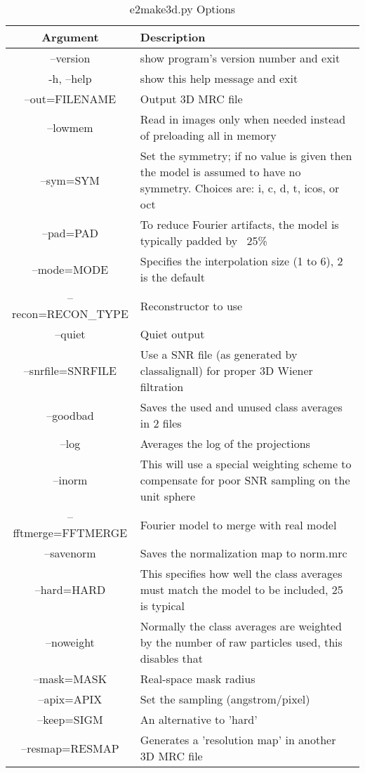 \begin{longtable}{|c||p{3.5in}|}
\hline \bf{Argument} & \bf{Description}\endhead
\hline \multicolumn{2}{r}{{Continued on next page}} \endfoot
\hline \hline \caption[e2make3d.py Options]{e2make3d.py Options}\endlastfoot
\\\hline   --version  &  show program's version number and exit
\\\hline   -h, --help  &  show this help message and exit
\\\hline   --out=FILENAME  &  Output 3D MRC file
\\\hline   --lowmem  &  Read in images only when needed instead of preloading all in memory
\\\hline   --sym=SYM  &  Set the symmetry; if no value is given then the model is assumed to have no symmetry. Choices are: i, c, d, t, icos, or oct
\\\hline   --pad=PAD  &  To reduce Fourier artifacts, the model is typically padded by ~25\%
\\\hline   --mode=MODE  &  Specifies the interpolation size (1 to 6), 2 is the default
\\\hline   --recon=RECON\_TYPE  &  Reconstructor to use
\\\hline   --quiet  &  Quiet output
\\\hline   --snrfile=SNRFILE  &  Use a SNR file (as generated by classalignall) for proper 3D Wiener filtration
\\\hline   --goodbad  &  Saves the used and unused class averages in 2 files
\\\hline   --log  &  Averages the log of the projections
\\\hline   --inorm  &  This will use a special weighting scheme to compensate for poor SNR sampling on the unit sphere
\\\hline   --fftmerge=FFTMERGE  &  Fourier model to merge with real model
\\\hline   --savenorm  &  Saves the normalization map to norm.mrc
\\\hline   --hard=HARD  &  This specifies how well the class averages must match the model to be included, 25 is typical
\\\hline   --noweight  &  Normally the class averages are weighted by the number of raw particles used, this disables that
\\\hline   --mask=MASK  &  Real-space mask radius
\\\hline   --apix=APIX  &  Set the sampling (angstrom/pixel)
\\\hline   --keep=SIGM  &  An alternative to 'hard'
\\\hline
 --resmap=RESMAP  &  Generates a 'resolution map' in another 3D MRC file
\\\hline
\end{longtable}
